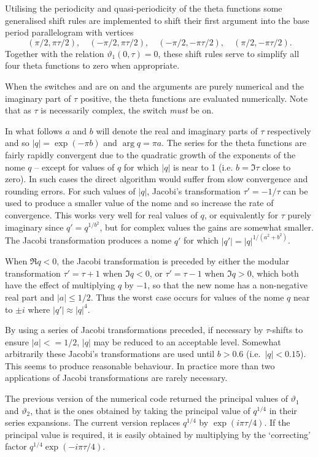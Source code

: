 Utilising the periodicity and quasi-periodicity of the theta functions
some generalised shift rules are implemented to shift their first argument
into the base period parallelogram with vertices
\[(\pi/2, \pi\tau/2),\quad (-\pi/2, \pi\tau/2),\quad (-\pi/2, -\pi\tau/2),
\quad (\pi/2, -\pi\tau/2).\]
Together with the relation $\vartheta_1(0,\tau)=0$,  these shift rules serve to
simplify all four theta functions to zero when appropriate.

When the switches  and  are on and the arguments are
purely numerical and the imaginary part of $\tau$ positive,
the theta functions are evaluated numerically. Note that as $\tau$ is
necessarily complex, the switch  \emph{must} be on.

In what follows $a$ and $b$ will denote the real and imaginary parts of
$\tau$ respectively and so $|q| = \exp(-\pi b)$ and $\arg q =\pi a$.
The series for the theta functions are fairly rapidly convergent
due to the quadratic growth of the exponents of the nome $q$ -- except
for values of $q$ for which $|q|$ is near to 1
(i.e. $b=\Im \tau $ close to zero).
In such cases the direct algorithm would suffer from slow convergence and
rounding errors.
For such values of $|q|$, Jacobi's transformation $\tau'=-1/\tau$ can be
used to produce a smaller value of the nome and so increase the rate of
convergence.
This works very well for real values of $q$, or equivalently for $\tau$ purely
imaginary since $q'= q^{1/b^2}$, but for complex
values the gains are somewhat smaller. The Jacobi transformation produces a
nome $q'$ for which $|q'| =  |q|^{1/(a^2+b^2)}$.

When $\Re q < 0$, the Jacobi transformation is preceded by either the
modular transformation $\tau' = \tau+1$ when $\Im q < 0$, or $\tau' = \tau-1$
when $\Im q > 0$, which both have the effect  of multiplying $q$ by $-1$,
so that the new nome has a non-negative real part and $|a| \leq 1/2$.
Thus the worst case occurs for values of the nome $q$ near to $\pm i$ where
$|q'| \approx |q|^4$.

By using a series of Jacobi transformations preceded, if necessary by
$\tau$-shifts to ensure $|a| <= 1/2$, $|q|$ may be reduced to an acceptable
level. Somewhat arbitrarily these Jacobi's transformations are used
until $b > 0.6$ (i.e.~$|q| < 0.15$). This seems to produce reasonable
behaviour. In practice more than two applications of Jacobi transformations
are rarely necessary.

The previous version of the numerical code returned the principal values
of $\vartheta_1$ and $\vartheta_2$, that is the ones obtained by taking
the principal value of $q^{1/4}$ in their series expansions. The current version replaces
$q^{1/4}$ by $\exp(i\pi\tau/4)$.  If the principal value is required, it is easily obtained
by multiplying by the `correcting' factor $q^{1/4}\exp(-i\pi\tau/4)$.

